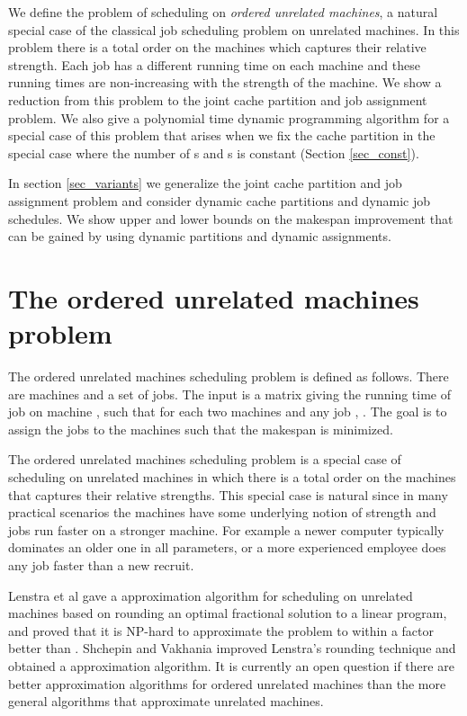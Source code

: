 \documentclass[11pt]{article}
\begin{document}
We define the problem of scheduling on {\em ordered unrelated
machines}, a natural special case of the classical job scheduling
problem on unrelated machines.
In this problem there is a total order on the machines which captures their relative strength.
Each job has a different running time on each machine
and these running times are non-increasing with the strength of the
machine. We show a reduction from this problem to the joint
cache partition and job assignment problem. We also give a
polynomial time dynamic programming algorithm for a special case of
this problem that arises when we fix the cache partition in the
special case where the number of s and s is constant (Section \ref{sec_const}).

In section \ref{sec_variants} we generalize the joint cache
partition and job assignment problem and consider dynamic cache
partitions and dynamic job schedules. We show upper and lower bounds
on the makespan improvement that can be gained by using dynamic partitions and
dynamic assignments.


\section{The ordered unrelated machines problem}\label{sec:scheduling}
The ordered unrelated machines scheduling problem is defined as follows.
There are  machines and a set  of jobs.
The input is a matrix  giving the running time of job  on machine , such that for each two machines  and any job , . The goal is to assign the jobs to the machines such that  the makespan is minimized.

The ordered unrelated machines scheduling problem is a  special case of scheduling on unrelated machines in which
there is a total order on the machines that captures their relative strengths.
This special case is natural since
in many practical scenarios the machines have some underlying notion of strength and jobs run faster on a stronger machine.
For example a newer computer typically dominates an older one in all parameters, or a more experienced employee does any job faster than
a new recruit.

Lenstra et al \cite{LST90}
gave a  approximation algorithm for scheduling on unrelated machines based on
 rounding an optimal fractional
solution to a linear program, and proved that it is NP-hard to approximate the problem to within a factor better than
. Shchepin and  Vakhania \cite{SV05} improved Lenstra's rounding technique  and obtained a  approximation algorithm. It is currently an open question if there are better approximation algorithms for ordered unrelated machines than the more general algorithms that approximate unrelated machines.
\end{document}
